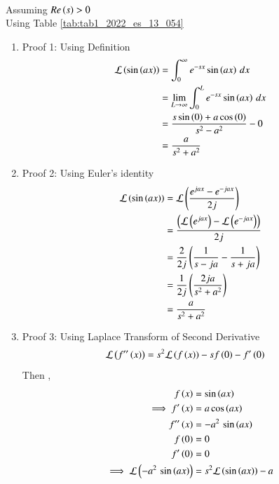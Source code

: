 \documentclass[journal,12pt,twocolumn]{IEEEtran}
\begin{document}
\solution\\
Assuming $Re\left(s\right)>0$\\
Using Table \ref{tab:tab1_2022_es_13_054}
\begin{enumerate}
    \item Proof 1: Using Definition\\
    \begin{align}
        \mathcal{L}\left(\sin\left(ax\right)\right) &= \int_{0}^{\infty}e^{-sx}\sin\left(ax\right)\, dx\\
        &= \lim_{L\to \infty} \int_{0}^{L}e^{-sx}\sin\left(ax\right)\, dx\\
        &= \frac{s\sin\left(0\right) + a\cos\left(0\right)}{s^2 - a^2} - 0\\
        &= \frac{a}{s^2 + a^2}
    \end{align}
\bigskip
    \item Proof 2: Using Euler's identity\\
    \begin{align}
        \mathcal{L}\left(\sin\left(ax\right)\right) &= \mathcal{L}\left(\frac{e^{jax} - e^{-jax}}{2j}\right)\\
        &= \frac{\left(\mathcal{L}\left(e^{jax}\right) - \mathcal{L}\left(e^{-jax}\right)\right)}{2j}\\
        &= \frac{2}{2j}\left(\frac{1}{s-ja}-\frac{1}{s+ja}\right)\\
        &= \frac{1}{2j}\left(\frac{2ja}{s^2 + a^2}\right)\\
        &= \frac{a}{s^2 + a^2}
    \end{align}
\bigskip
    \item Proof 3: Using Laplace Transform of Second Derivative\\
    \begin{align}
        \mathcal{L}\left(f''\left(x\right)\right) &= s^2\mathcal{L}\left(f\left(x\right)\right) - sf\left(0\right) - f'\left(0\right)
    \end{align}
    Then ,
    \begin{align}
        f\brak{x} &= \sin\brak{ax}\\
        \implies f'\brak{x} &= a\cos\brak{ax}\\
        f''\brak{x} &= -a^2\, \sin\brak{ax}\\
        f\brak{0}&=0\\
        f'\brak{0} &= 0\\
        \implies \mathcal{L}\brak{-a^2\, \sin\brak{ax}} &= s^2\mathcal{L}\brak{\sin\brak{ax}} - a\\

\end{align}
\end{enumerate}
\end{document}
